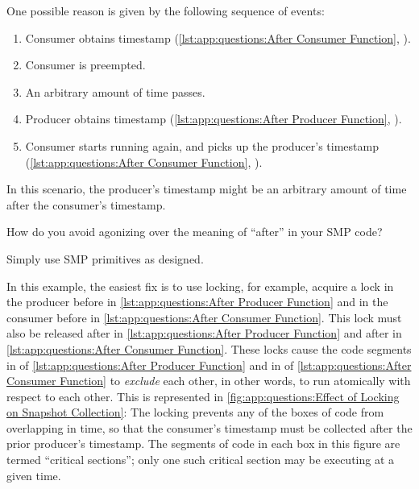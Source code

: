 \begin{fcvref}
One possible reason is given by the following sequence of events:
\begin{enumerate}
\item	Consumer obtains timestamp
	(\cref{lst:app:questions:After Consumer Function},
	).
\item	Consumer is preempted.
\item	An arbitrary amount of time passes.
\item	Producer obtains timestamp
	(\cref{lst:app:questions:After Producer Function},
	).
\item	Consumer starts running again, and picks up the producer's
	timestamp
	(\cref{lst:app:questions:After Consumer Function},
	).
\end{enumerate}

In this scenario, the producer's timestamp might be an arbitrary
amount of time after the consumer's timestamp.

How do you avoid agonizing over the meaning of ``after'' in your
SMP code?

Simply use SMP primitives as designed.

In this example, the easiest fix is to use locking, for example,
acquire a lock in the producer before  in
\cref{lst:app:questions:After Producer Function} and in
the consumer before  in
\cref{lst:app:questions:After Consumer Function}.
This lock must also be released after  in
\cref{lst:app:questions:After Producer Function} and
after  in
\cref{lst:app:questions:After Consumer Function}.
These locks cause the code segments in
 of
\cref{lst:app:questions:After Producer Function} and in
 of
\cref{lst:app:questions:After Consumer Function} to {\em exclude}
each other, in other words, to run atomically with respect to each other.
This is represented in
\cref{fig:app:questions:Effect of Locking on Snapshot Collection}:
The locking prevents any of the boxes of code from overlapping in time, so
that the consumer's timestamp must be collected after the prior
producer's timestamp.
The segments of code in each box in this figure are termed
``critical sections''; only one such critical section may be executing
at a given time.
\end{fcvref}

